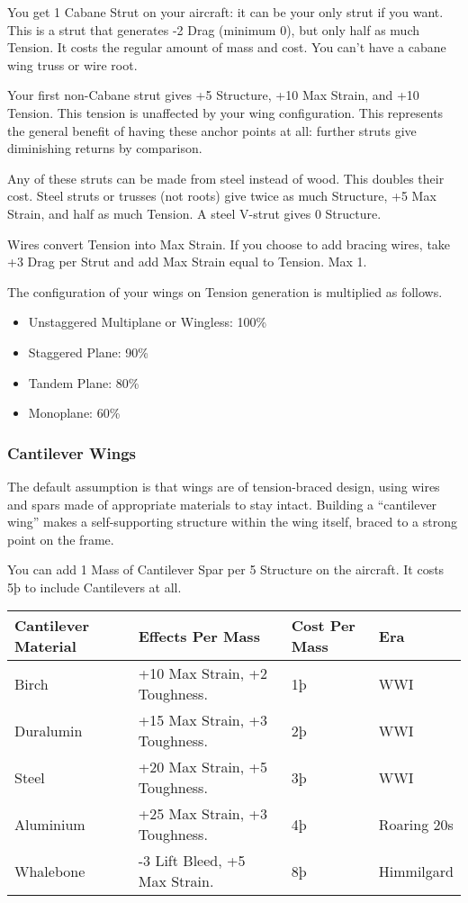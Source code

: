 \documentclass{article}
\begin{document}
You get 1 Cabane Strut on your aircraft: it can be your only
strut if you want. This is a strut that generates -2 Drag (minimum 0),
but only half as much Tension. It costs the regular amount of mass and
cost. You can't have a cabane wing truss or wire root.

Your first non-Cabane strut gives +5 Structure, +10 Max Strain,
and +10 Tension. This tension is unaffected by your wing configuration.
This represents the general benefit of having these anchor points at
all: further struts give diminishing returns by comparison.

Any of these struts can be made from steel instead of wood. This
doubles their cost. Steel struts or trusses (not roots) give twice as
much Structure, +5 Max Strain, and half as much Tension. A steel V-strut
gives 0 Structure.

Wires convert Tension into Max Strain. If you choose to add
bracing wires, take +3 Drag per Strut and add Max Strain equal to
Tension. Max 1.

The configuration of your wings on Tension generation is
multiplied as follows.

\begin{itemize}
    \item          Unstaggered Multiplane or Wingless: 100\%
    \item          Staggered Plane: 90\%
    \item          Tandem Plane: 80\%
    \item          Monoplane: 60\%
\end{itemize}

\subsubsection{Cantilever Wings}
\label{_Cantilever_Wings}

The default assumption is that wings are of tension-braced design, using
wires and spars made of appropriate materials to stay intact. Building a
``cantilever wing'' makes a self-supporting structure within the wing
itself, braced to a strong point on the frame.

You can add 1 Mass of Cantilever Spar per 5 Structure on the aircraft.
It costs 5þ to include Cantilevers at all.

\begin{tabular}{|l|l|l|l|}
    \hline
    Cantilever Material & Effects Per Mass              & Cost Per Mass & Era         \\\hline
    Birch               & +10 Max Strain, +2 Toughness. & 1þ            & WWI         \\\hline
    Duralumin           & +15 Max Strain, +3 Toughness. & 2þ            & WWI         \\\hline
    Steel               & +20 Max Strain, +5 Toughness. & 3þ            & WWI         \\\hline
    Aluminium           & +25 Max Strain, +3 Toughness. & 4þ            & Roaring 20s \\\hline
    Whalebone           & -3 Lift Bleed, +5 Max Strain. & 8þ            & Himmilgard  \\\hline
\end{tabular}
\end{document}
